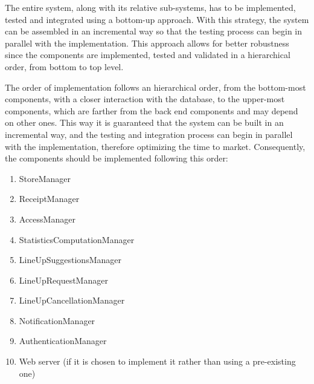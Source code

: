 \documentclass[../../main.tex]{subfiles}
\begin{document}
The entire system, along with its relative sub-systems, has to be implemented, tested and integrated using a bottom-up approach. 
With this strategy, the system can be assembled in an incremental way so that the testing process can begin in parallel with the implementation. 
This approach allows for better robustness since the components are implemented, tested and validated in a hierarchical order, from bottom to top level.


The order of implementation follows an hierarchical order, from the bottom-most components, with a closer interaction with the database, to the upper-most components, which are farther from the back end components and may depend on other ones. 
This way it is guaranteed that the system can be built in an incremental way, and the testing and integration process can begin in parallel with the implementation, therefore optimizing the time to market. 
Consequently, the components should be implemented following this order:

\begin{enumerate}

	\item StoreManager
	\item ReceiptManager
	\item AccessManager
	\item StatisticsComputationManager
	\item LineUpSuggestionsManager
	\item LineUpRequestManager
	\item LineUpCancellationManager
	\item NotificationManager
	\item AuthenticationManager
	\item Web server (if it is chosen to implement it rather than using a pre-existing one)

\end{enumerate}

\end{document}
